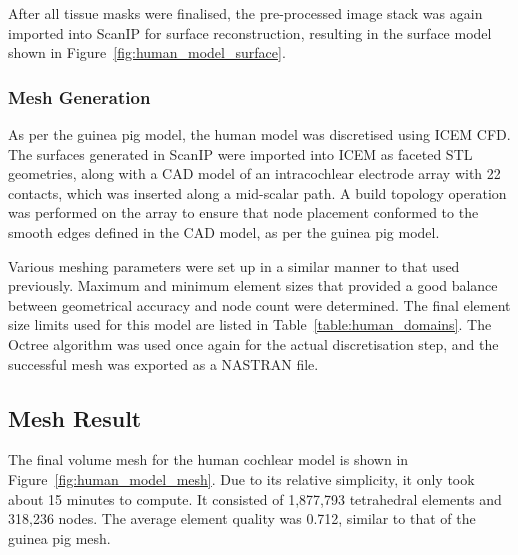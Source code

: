 After all tissue masks were finalised, the pre-processed image stack was again
imported into ScanIP for surface reconstruction, resulting in the surface
model shown in Figure~\ref{fig:human_model_surface}.

\subsubsection{Mesh Generation}

As per the guinea pig model, the human model was discretised using ICEM CFD. The
surfaces generated in ScanIP were imported into ICEM as faceted STL geometries,
along with a CAD model of an intracochlear electrode array with 22 contacts,
which was inserted along a mid-scalar path. A build topology operation was
performed on the array to ensure that node placement conformed to the smooth
edges defined in the CAD model, as per the guinea pig model.

Various meshing parameters were set up in a similar manner to that used
previously. Maximum and minimum element sizes that provided a good balance
between geometrical accuracy and node count were determined. The final element
size limits used for this model are listed in Table~\ref{table:human_domains}.
The Octree algorithm was used once again for the actual discretisation
step, and the successful mesh was exported as a NASTRAN file.

\subsection{Mesh Result}

The final volume mesh for the human cochlear model is shown in
Figure~\ref{fig:human_model_mesh}. Due to its relative simplicity, it only took
about 15 minutes to compute. It consisted of 1,877,793 tetrahedral elements and
318,236 nodes. The average element quality was 0.712, similar to that of the
guinea pig mesh.

